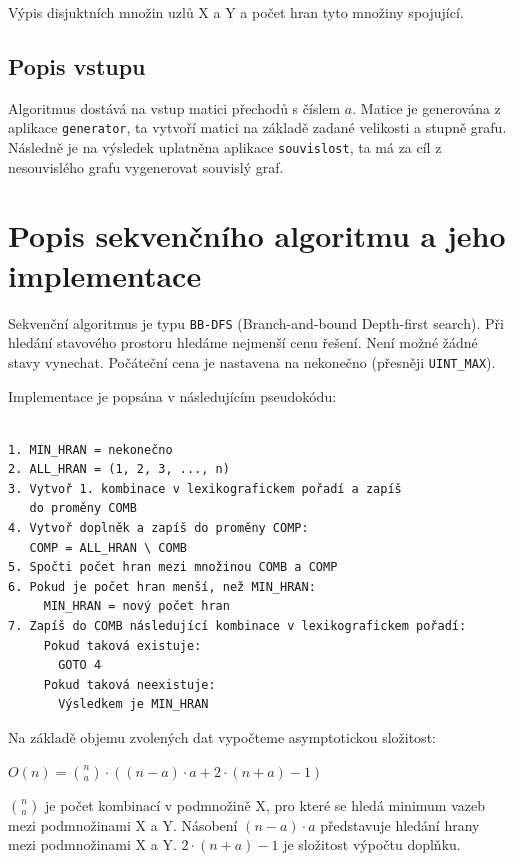 \documentclass[12pt]{article}
\begin{document}
Výpis disjuktních množin uzlů X a Y a počet hran tyto množiny spojující.

\subsection{Popis vstupu}

Algoritmus dostává na vstup matici přechodů s číslem $a$. Matice je generována z aplikace \texttt{generator}, ta vytvoří matici na základě zadané velikosti a stupně grafu. Následně je na výsledek uplatněna aplikace \texttt{souvislost}, ta má za cíl z nesouvislého grafu vygenerovat souvislý graf.

\section{Popis sekvenčního algoritmu a jeho implementace}

Sekvenční algoritmus je typu \texttt{BB-DFS} (Branch-and-bound Depth-first search). Při hledání stavového prostoru hledáme nejmenší cenu řešení. Není možné žádné stavy vynechat. Počáteční cena je nastavena na nekonečno (přesněji \texttt{UINT\_MAX}).

Implementace je popsána v následujícím pseudokódu:
\begin{verbatim}

1. MIN_HRAN = nekonečno
2. ALL_HRAN = (1, 2, 3, ..., n)
3. Vytvoř 1. kombinace v lexikografickem pořadí a zapíš 
   do proměny COMB
4. Vytvoř doplněk a zapíš do proměny COMP: 
   COMP = ALL_HRAN \ COMB
5. Spočti počet hran mezi množinou COMB a COMP
6. Pokud je počet hran menší, než MIN_HRAN:
     MIN_HRAN = nový počet hran
7. Zapíš do COMB následující kombinace v lexikografickem pořadí: 
     Pokud taková existuje:
       GOTO 4
     Pokud taková neexistuje:
       Výsledkem je MIN_HRAN 

\end{verbatim}

Na základě objemu zvolených dat vypočteme asymptotickou složitost: 

\hspace{1cm}

$O(n)={n\choose a} \cdot ((n - a) \cdot a + 2 \cdot (n + a) - 1)$

\hspace{1cm}

${n\choose a}$ je počet kombinací v podmnožině X, pro které se hledá minimum vazeb mezi podmnožinami X a Y. Násobení $(n - a) \cdot a$ představuje hledání hrany mezi podmnožinami X a Y. $2 \cdot (n + a) - 1$ je složitost výpočtu doplňku.
\end{document}
